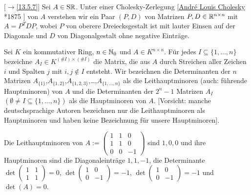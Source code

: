 \documentclass[../../main.tex]{subfiles}
\begin{document}
\begin{df}\mbox{}[$\to$\ref{13.5.7}]
\label{14.2.8}
Sei $A\in \operatorname{S\mathbb R}$. Unter einer Cholesky-Zerlegung [\href{https://en.wikipedia.org/wiki/Andre-Louis_Cholesky}{Andr\'{e} Louis Cholesky} *1875 ] von $A$ verstehen wir ein Paar $(P,D)$ von Matrizen $P,D\in \mathbb R^{n\times n}$ mit $A=P^TDP$, wobei $P$ von oberere Dreiecksgestalt ist mit lauter Einsen auf der Diagonale und $D$ von Diagonalgestalt ohne negative Einträge.
\end{df}

\begin{df}\label{14.2.9}
Sei $K$ ein kommutativer Ring, $n\in \mathbb N_0$ und $A\in K^{n\times n}$. Für jedes $I\subseteq\{1,\ldots ,n\}$ bezeichne $A_I\in K^{(\#I)\times (\#I)}$ die Matrix, die aus $A$ durch Streichen aller Zeichen $i$ und Spalten $j$ mit $i,j\notin I$ entsteht. Wir bezeichnen die Determinanten der $n$ Matrizen $A_{\{1\}}$,$A_{\{1,2\}}$,$A_{\{1,2,3\}}$,\ldots ,$A_{\{1,\ldots ,n\}}$ als die Leithauptminoren (auch: führende Hauptminoren) von $A$ und die Determinanten der $2^{n}-1$ Matrizen $A_I$ $(\emptyset \neq I\subseteq\{1,\ldots ,n\})$ als die Hauptminoren von $A$. [Vorsicht: manche deutschsprachige Autoren bezeichnen nur die Leithauptminoren als Hauptminoren und haben keine Bezeichnung für unsere Hauptminoren].
\end{df}

\begin{bsp}\label{14.2.10}
Die Leithauptminoren von $A:=\begin{pmatrix*}1&1&0\\1&1&0\\ 0&0&-1\end{pmatrix*}$ sind $1,0,0$ und ihre Hauptminoren sind die Diagonaleinträge $1,1,-1$, die Determinante $\det\begin{pmatrix*}1&1\\1&1\end{pmatrix*}=0$, $\det\begin{pmatrix*}1&0\\0&-1\end{pmatrix*}=-1$, $\det\begin{pmatrix*}1&0\\0&-1\end{pmatrix*}=-1$ und $\det(A)=0$.
\end{bsp}
\end{document}
